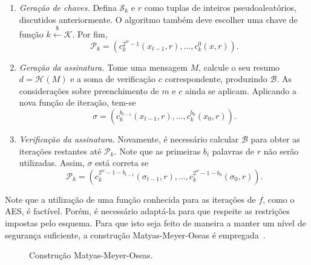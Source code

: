 \documentclass{ufsctex/ufsctex}
\newcommand{\pk}{\mathcal{P}_{k}}
\newcommand{\sk}{\mathcal{S}_{k}}
\newcommand{\hash}[2][]{\mathcal{H}^{#1} (#2)}
\newcommand{\random}{\stackrel{\$}{\longleftarrow}}
\begin{document}
\begin{enumerate}

  \item[] \emph{Geração de chaves.} Defina $\sk{}$ e $r$ como tuplas de
      inteiros pseudoaleatórios, discutidos anteriormente. O algoritmo também
        deve escolher uma chave de função $k \random{} \mathcal{K}$. Por fim,
        \begin{equation}
          \pk{} = (c^{2^{w}-1}_{k}(x_{t - 1}, r), \dots, c^{0}_{k}(x, r)).
        \end{equation}

  \item[] \emph{Geração da assinatura.} Tome uma mensagem $M$, calcule o seu
      resumo $d = \hash{M}$ e a soma de verificação $c$ correspondente,
        produzindo $\mathcal{B}$. As considerações sobre preenchimento de $m$ e
        $c$ ainda se aplicam. Aplicando a nova função de iteração, tem-se
        \begin{equation}
          \sigma = (c^{b_{t - 1}}_{k}(x_{t - 1}, r),
            \dots, c^{b_{0}}_{k}(x_{0}, r)).
        \end{equation}

  \item[] \emph{Verificação da assinatura.} Novamente, é necessário calcular
      $\mathcal{B}$ para obter as iterações restantes até $\pk{}$. Note que as
        primeiras $b_{i}$ palavras de $r$ não serão utilizadas. Assim, $\sigma$
        está correta se
        \begin{equation}
          \pk{} = (c^{2^{w} - 1 - b_{t - 1}}_{k}(\sigma_{t - 1}, r),
            \dots, c^{2^{w} - 1 - b_{0}}_{k}(\sigma_{0}, r)).
        \end{equation}

\end{enumerate}

Note que a utilização de uma função conhecida para as iterações de $f$, como o
AES, é factível. Porém, é necessário adaptá-la para que respeite as restrições
impostas pelo esquema. Para que isto seja feito de maneira a manter um nível de
segurança suficiente, a construção Matyas-Meyer-Oseas é
empregada~\cite[Algoritmo 9.41]{Menezes:book:1996}.

\begin{figure}
  \centering
  \caption{Construção Matyas-Meyer-Oseas.}\label{fig:6}
\end{figure}
\end{document}
